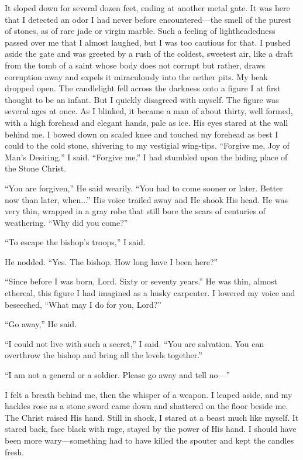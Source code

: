It sloped down for several dozen feet, ending at another metal gate. It was here that I detected an odor I had never before encountered—the smell of the purest of stones, as of rare jade or virgin marble. Such a feeling of lightheadedness passed over me that I almost laughed, but I was too cautious for that. I pushed aside the gate and was greeted by a rush of the coldest, sweetest air, like a draft from the tomb of a saint whose body does not corrupt but rather, draws corruption away and expels it miraculously into the nether pits. My beak dropped open. The candlelight fell across the darkness onto a figure I at first thought to be an infant. But I quickly disagreed with myself. The figure was several ages at once. As I blinked, it became a man of about thirty, well formed, with a high forehead and elegant hands, pale as ice. His eyes stared at the wall behind me. I bowed down on scaled knee and touched my forehead as best I could to the cold stone, shivering to my vestigial wing-tips. ``Forgive me, Joy of Man's Desiring,'' I said. ``Forgive me.'' I had stumbled upon the hiding place of the Stone Christ.

``You are forgiven,'' He said wearily. ``You had to come sooner or later. Better now than later, when...'' His voice trailed away and He shook His head. He was very thin, wrapped in a gray robe that still bore the scars of centuries of weathering. ``Why did you come?''

``To escape the bishop's troops,'' I said.

He nodded. ``Yes. The bishop. How long have I been here?''

``Since before I was born, Lord. Sixty or seventy years.'' He was thin, almost ethereal, this figure I had imagined as a husky carpenter. I lowered my voice and beseeched, ``What may I do for you, Lord?''

``Go away,'' He said.

``I could not live with such a secret,'' I said. ``You are salvation. You can overthrow the bishop and bring all the levels together.''

``I am not a general or a soldier. Please go away and tell no—''

I felt a breath behind me, then the whisper of a weapon. I leaped aside, and my hackles rose as a stone sword came down and shattered on the floor beside me. The Christ raised His hand. Still in shock, I stared at a beast much like myself. It stared back, face black with rage, stayed by the power of His hand. I should have been more wary—something had to have killed the spouter and kept the candles fresh.

